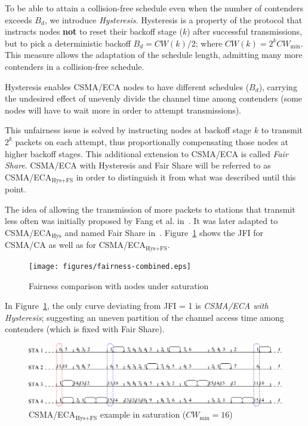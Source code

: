 \documentclass[a4paper,journal]{IEEEtran}
\begin{document}
	To be able to attain a collision-free schedule even when the number of contenders exceeds $B_{d}$, we introduce \emph{Hysteresis}. Hysteresis is a property of the protocol that instructs nodes {\bfseries not} to reset their backoff stage ($k$) after successful transmissions, but to pick a deterministic backoff $B_{d}=CW(k)/2$; where $CW(k)=2^{k}CW_{\min}$. This measure allows the adaptation of the schedule length, admitting many more contenders in a collision-free schedule.
	
	Hysteresis enables CSMA/ECA nodes to have different schedules ($B_{d}$), carrying the undesired effect of unevenly divide the channel time among contenders (some nodes will have to wait more in order to attempt transmissions).
	
	This unfairness issue is solved by instructing nodes at backoff stage $k$ to transmit $2^{k}$ packets on each attempt, thus proportionally compensating those nodes at higher backoff stages. This additional extension to CSMA/ECA is called \emph{Fair Share}. CSMA/ECA with Hysteresis and Fair Share will be referred to as CSMA/ECA$_{\text{Hys+FS}}$ in order to distinguish it from what was described until this point.
	
	The idea of allowing the transmission of more packets to stations that transmit less often was initially proposed by Fang et al. in~\cite{L_MAC}. It was later adapted to CSMA/ECA$_{\text{Hys}}$ and named Fair Share in~\cite{research2standards}. Figure~\ref{fig:fairness} shows the JFI for CSMA/CA as well as for CSMA/ECA$_{\text{Hys+FS}}$.
	
	\begin{figure}[htbp]
	\centering
		\texttt{[image: figures/fairness-combined.eps]}
		\caption{Fairness comparison with nodes under saturation}
		\label{fig:fairness}
	\end{figure}
	
	In Figure~\ref{fig:fairness}, the only curve deviating from JFI = 1 is \emph{CSMA/ECA with Hysteresis}; suggesting an uneven partition of the channel access time among contenders (which is fixed with Fair Share).
	
	\begin{figure}[tbhp]
	\centering
		\includegraphics[width=0.8\linewidth]{figures/csma_eca_different_backoff_short.eps}
		\caption{CSMA/ECA$_{\text{Hys+FS}}$ example in saturation ($CW_{\min}=16$)}
		\label{fig:ECA+Hyst}
	\end{figure}
	
\end{document}
